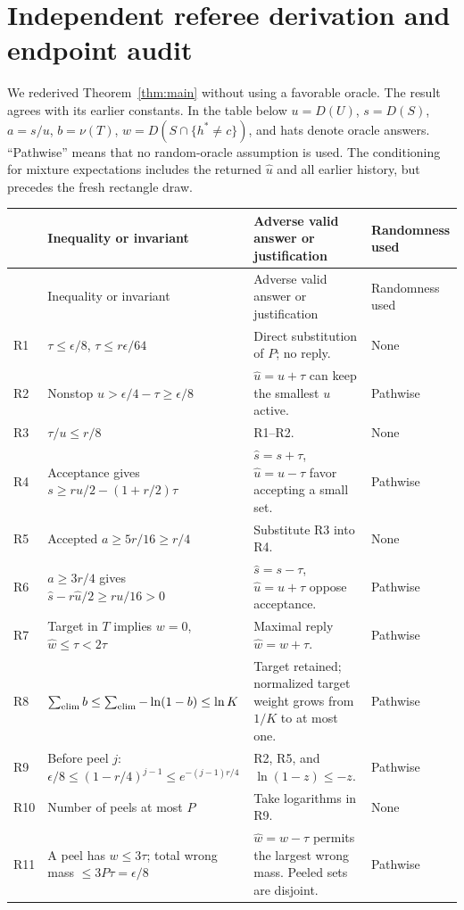 \section{Independent referee derivation and endpoint audit}\label{app:referee}
We rederived Theorem~\ref{thm:main} without using a favorable oracle. The result agrees with its earlier constants. In the table below $u=D(U)$, $s=D(S)$, $a=s/u$, $b=\nu(T)$, $w=D(S\cap\{h^*\ne c\})$, and hats denote oracle answers. ``Pathwise'' means that no random-oracle assumption is used. The conditioning for mixture expectations includes the returned $\widehat u$ and all earlier history, but precedes the fresh rectangle draw.

\small
\begin{longtable}{@{}p{.6cm}p{6.2cm}p{4.9cm}>{\raggedright\arraybackslash}p{2.4cm}@{}}
\toprule
& Inequality or invariant & Adverse valid answer or justification & Randomness used\\
\midrule\endfirsthead
\toprule & Inequality or invariant & Adverse valid answer or justification & Randomness used\\\midrule\endhead
R1 & $\tau\le\epsilon/8$, $\tau\le r\epsilon/64$ & Direct substitution of $P$; no reply. & None\\
R2 & Nonstop $u>\epsilon/4-\tau\ge\epsilon/8$ & $\widehat u=u+\tau$ can keep the smallest $u$ active. & Pathwise\\
R3 & $\tau/u\le r/8$ & R1--R2. & None\\
R4 & Acceptance gives $s\ge ru/2-(1+r/2)\tau$ & $\widehat s=s+\tau$, $\widehat u=u-\tau$ favor accepting a small set. & Pathwise\\
R5 & Accepted $a\ge5r/16\ge r/4$ & Substitute R3 into R4. & None\\
R6 & $a\ge3r/4$ gives $\widehat s-r\widehat u/2\ge ru/16>0$ & $\widehat s=s-\tau$, $\widehat u=u+\tau$ oppose acceptance. & Pathwise\\
R7 & Target in $T$ implies $w=0$, $\widehat w\le\tau<2\tau$ & Maximal reply $\widehat w=w+\tau$. & Pathwise\\
R8 & $\sum_{\rm elim}b\le\sum_{\rm elim}-\ln(1-b)\le\ln K$ & Target retained; normalized target weight grows from $1/K$ to at most one. & Pathwise\\
R9 & Before peel $j$: $\epsilon/8\le(1-r/4)^{j-1}\le e^{-(j-1)r/4}$ & R2, R5, and $\ln(1-z)\le-z$. & Pathwise\\
R10 & Number of peels at most $P$ & Take logarithms in R9. & None\\
R11 & A peel has $w\le3\tau$; total wrong mass $\le3P\tau=\epsilon/8$ & $\widehat w=w-\tau$ permits the largest wrong mass. Peeled sets are disjoint. & Pathwise\\

\end{longtable}

